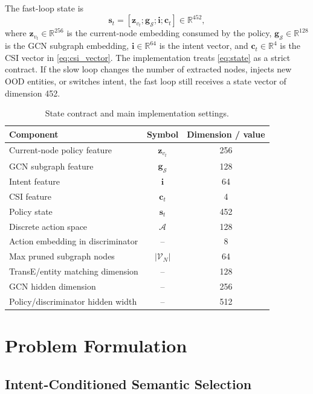\documentclass[journal]{IEEEtran}
\newcommand{\SG}{\mathcal{S}}
\newcommand{\calA}{\mathcal{A}}
\newcommand{\calV}{\mathcal{V}}
\newcommand{\R}{\mathbb{R}}
\begin{document}
The fast-loop state is
\begin{equation}
\label{eq:state}
\mathbf{s}_t =
\left[\mathbf{z}_{v_t};\mathbf{g}_{\SG};\mathbf{i};\mathbf{c}_t\right]\in\R^{452},
\end{equation}
where $\mathbf{z}_{v_t}\in\R^{256}$ is the current-node embedding consumed by the policy, $\mathbf{g}_{\SG}\in\R^{128}$ is the GCN subgraph embedding, $\mathbf{i}\in\R^{64}$ is the intent vector, and $\mathbf{c}_t\in\R^4$ is the CSI vector in \eqref{eq:csi_vector}. The implementation treats \eqref{eq:state} as a strict contract. If the slow loop changes the number of extracted nodes, injects new OOD entities, or switches intent, the fast loop still receives a state vector of dimension 452.

\begin{table}[!t]
\centering
\caption{State contract and main implementation settings.}
\label{tab:contract}
\begin{tabular}{lcc}
\toprule
Component & Symbol & Dimension / value\\
\midrule
Current-node policy feature & $\mathbf{z}_{v_t}$ & 256\\
GCN subgraph feature & $\mathbf{g}_{\SG}$ & 128\\
Intent feature & $\mathbf{i}$ & 64\\
CSI feature & $\mathbf{c}_t$ & 4\\
\midrule
Policy state & $\mathbf{s}_t$ & 452\\
Discrete action space & $\calA$ & 128\\
Action embedding in discriminator & -- & 8\\
Max pruned subgraph nodes & $|\calV_N|$ & 64\\
TransE/entity matching dimension & -- & 128\\
GCN hidden dimension & -- & 256\\
Policy/discriminator hidden width & -- & 512\\
\bottomrule
\end{tabular}
\end{table}

\section{Problem Formulation}

\subsection{Intent-Conditioned Semantic Selection}
\end{document}

